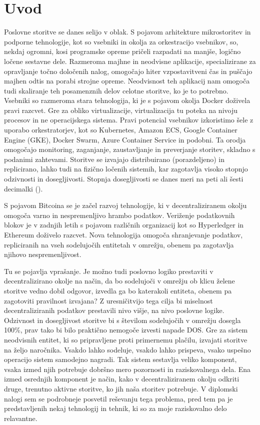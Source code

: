 \documentclass[a4paper, 12pt]{book}
\begin{document}
\chapter{Uvod}
Poslovne storitve se danes selijo v oblak.
S pojavom arhitekture mikrostoritev in podporne tehnologije, kot so vsebniki in okolja za orkestracijo vsebnikov, so, nekdaj ogromni, kosi programske opreme pričeli razpadati na manjše, logično ločene sestavne dele.
Razmeroma majhne in neodvisne aplikacije, specializirane za opravljanje točno določenih nalog, omogočajo hiter vzpostavitveni čas in puščajo majhen odtis na porabi strojne opreme.
Neodvisnost teh aplikacij nam omogoča tudi skaliranje teh posamenznih delov celotne storitve, ko je to potrebno.
Vsebniki so razmeroma stara tehnologija, ki je s pojavom okolja Docker doživela pravi razcvet.
Gre za  obliko virtualizacije, virtualizacija tu poteka na nivoju procesov in ne operacijskega sistema.
Pravi potencial vsebnikov izkoristimo šele z uporabo orkestratorjev, kot so Kubernetes, Amazon ECS, Google Container Engine (GKE), Docker Swarm, Azure Container Service in podobni.
Ta orodja omogočajo monitoring, zaganjanje, zaustavljanje in preverjanje storitev, skladno s podanimi zahtevami.
Storitve se izvajajo distribuirano (porazdeljeno) in replicirano, lahko tudi na fizično ločenih sistemih, kar zagotavlja visoko stopnjo odzivnosti in dosegljivosti. Stopnja dosegljivosti se danes meri na peti ali šesti decimalki ().

S pojavom Bitcoina se je začel razvoj tehnologije, ki v decentraliziranem okolju omogoča varno in nespremenljivo hrambo podatkov.
Veriženje podatkovnih blokov je v zadnjih letih s pojavom različnih organizacij kot so Hyperledger in Ethereum doživelo razcvet.
Nova tehnologija omogoča shranjevanje podatkov, repliciranih na vseh sodelujočih entitetah v omrežju, obenem pa zagotavlja njihovo nespremenljivost.

Tu se pojavlja vprašanje. 
Je možno tudi poslovno logiko prestaviti v decentralizirano okolje na način, da bo sodelujoči v omrežju ob klicu želene storitve vedno dobil odgovor, izvedla ga bo katerakoli entiteta, obenem pa zagotoviti pravilnost izvajana?
Z uresničitvijo tega cilja bi miselnost decentraliziranih podatkov prestavili nivo višje, na nivo poslovne logike.
Odzivnost in dosegljivost storitve bi s številom sodelujočih v omrežju dosegla 100\%, prav tako bi bilo praktično nemogoče izvesti napade DOS.
Gre za sistem neodvisnih entitet, ki so pripravljene proti primernemu plačilu, izvajati storitve na željo naročnika.
Vsakdo lahko sodeluje, vsakdo lahko prispeva, vsako uspešno operacijo sistem samodejno nagradi.
Tak sistem sestavlja veliko komponent, vsaka izmed njih potrebuje dobršno mero pozornosti in raziskovalnega dela. Ena izmed osrednjih komponent je način, kako v decentraliziranem okolju odkriti druge, trenutno aktivne storitve, ko jih naša storitev potrebuje. 
V diplomski nalogi sem se podrobneje posvetil reševanju tega problema, pred tem pa je predstavljenih nekaj tehnologij in tehnik, ki so za moje raziskovalno delo relavantne.
\end{document}
